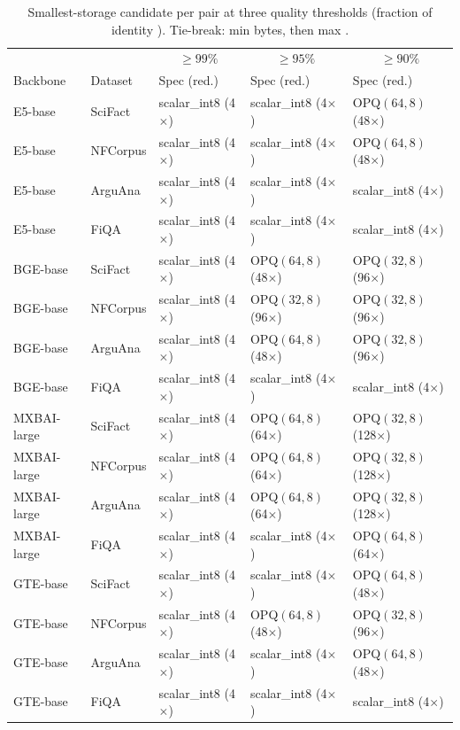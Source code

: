 \begin{table}[t]
\centering
\small
\caption{Smallest-storage candidate per pair at three quality thresholds (fraction of identity \ndcg{}). Tie-break: min bytes, then max \ndcg{}.}
\label{tab:thresholds}
\begin{tabular}{lllll}
\toprule
& & \multicolumn{1}{c}{$\ge\!99\%$ \ndcg{}} & \multicolumn{1}{c}{$\ge\!95\%$ \ndcg{}} & \multicolumn{1}{c}{$\ge\!90\%$ \ndcg{}} \\
Backbone & Dataset & Spec (red.) & Spec (red.) & Spec (red.) \\
\midrule
E5-base & SciFact & scalar\_int8 (4$\times$) & scalar\_int8 (4$\times$) & OPQ$(64,8)$ (48$\times$) \\
E5-base & NFCorpus & scalar\_int8 (4$\times$) & scalar\_int8 (4$\times$) & OPQ$(64,8)$ (48$\times$) \\
E5-base & ArguAna & scalar\_int8 (4$\times$) & scalar\_int8 (4$\times$) & scalar\_int8 (4$\times$) \\
E5-base & FiQA & scalar\_int8 (4$\times$) & scalar\_int8 (4$\times$) & scalar\_int8 (4$\times$) \\
BGE-base & SciFact & scalar\_int8 (4$\times$) & OPQ$(64,8)$ (48$\times$) & OPQ$(32,8)$ (96$\times$) \\
BGE-base & NFCorpus & scalar\_int8 (4$\times$) & OPQ$(32,8)$ (96$\times$) & OPQ$(32,8)$ (96$\times$) \\
BGE-base & ArguAna & scalar\_int8 (4$\times$) & OPQ$(64,8)$ (48$\times$) & OPQ$(32,8)$ (96$\times$) \\
BGE-base & FiQA & scalar\_int8 (4$\times$) & scalar\_int8 (4$\times$) & scalar\_int8 (4$\times$) \\
MXBAI-large & SciFact & scalar\_int8 (4$\times$) & OPQ$(64,8)$ (64$\times$) & OPQ$(32,8)$ (128$\times$) \\
MXBAI-large & NFCorpus & scalar\_int8 (4$\times$) & OPQ$(64,8)$ (64$\times$) & OPQ$(32,8)$ (128$\times$) \\
MXBAI-large & ArguAna & scalar\_int8 (4$\times$) & OPQ$(64,8)$ (64$\times$) & OPQ$(32,8)$ (128$\times$) \\
MXBAI-large & FiQA & scalar\_int8 (4$\times$) & scalar\_int8 (4$\times$) & OPQ$(64,8)$ (64$\times$) \\
GTE-base & SciFact & scalar\_int8 (4$\times$) & scalar\_int8 (4$\times$) & OPQ$(64,8)$ (48$\times$) \\
GTE-base & NFCorpus & scalar\_int8 (4$\times$) & OPQ$(64,8)$ (48$\times$) & OPQ$(32,8)$ (96$\times$) \\
GTE-base & ArguAna & scalar\_int8 (4$\times$) & scalar\_int8 (4$\times$) & OPQ$(64,8)$ (48$\times$) \\
GTE-base & FiQA & scalar\_int8 (4$\times$) & scalar\_int8 (4$\times$) & scalar\_int8 (4$\times$) \\
\bottomrule
\end{tabular}
\end{table}
